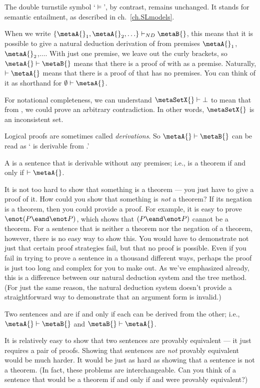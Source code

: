 The {double turnstile} symbol `$\models$', by contrast, remains unchanged. It stands for semantic entailment, as described in ch.~\ref{ch.SLmodels}.

When we write $\{\metaA{}_1,\metaA{}_2,\ldots\}\vdash_{ND}\metaB{}$, this means that it is possible to give a natural deduction derivation of \metaB{} from premises $\metaA{}_1$,$\metaA{}_2$,$\ldots$. With just one premise, we leave out the curly brackets, so $\metaA{}\vdash\metaB{}$ means that there is a proof of \metaB{} with \metaA{} as a premise. Naturally, $\vdash\metaA{}$ means that there is a proof of \metaA{} that has no premises. You can think of it as shorthand for $\emptyset\vdash\metaA{}$. 

For notational completeness, we can understand $\metaSetX{}\vdash\bot$ to mean that from \metaSetX{}, we could prove an arbitrary contradiction. In other words, $\metaSetX{}$ is an inconsistent set.

Logical proofs are sometimes called \emph{derivations}. So $\metaA{}\vdash\metaB{}$ can be read as `\metaB{} is derivable from \metaA{}.'

A  is a sentence that is derivable without any premises; i.e., \metaA{} is a theorem if and only if $\vdash\metaA{}$.

It is not too hard to show that something is a theorem --- you just have to give a proof of it. How could you show that something is \emph{not} a theorem? If its negation is a theorem, then you could provide a proof. For example, it is easy to prove $\enot(P \eand \enot P)$, which shows that $(P \eand \enot P)$ cannot be a theorem. For a sentence that is neither a theorem nor the negation of a theorem, however, there is no easy way to show this. You would have to demonstrate not just that certain proof strategies fail, but that no proof is possible. Even if you fail in trying to prove a sentence in a thousand different ways, perhaps the proof is just too long and complex for you to make out. As we've emphasized already, this is a difference between our natural deduction system and the tree method. (For just the same reason, the natural deduction system doesn't provide a straightforward way to demonstrate that an argument form is invalid.)

Two sentences \metaA{} and \metaB{} are  if and only if each can be derived from the other; i.e., $\metaA{}\vdash\metaB{}$ and $\metaB{}\vdash\metaA{}$.

It is relatively easy to show that two sentences are provably equivalent --- it just requires a pair of proofs. Showing that sentences are \emph{not} provably equivalent would be much harder. It would be just as hard as showing that a sentence is not a theorem. (In fact, these problems are interchangeable. Can you think of a sentence that would be a theorem if and only if \metaA{} and \metaB{} were provably equivalent?)

